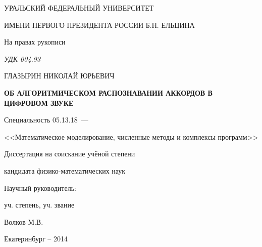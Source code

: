 \thispagestyle{empty}

\begin{center}
УРАЛЬСКИЙ ФЕДЕРАЛЬНЫЙ УНИВЕРСИТЕТ\par
ИМЕНИ ПЕРВОГО ПРЕЗИДЕНТА РОССИИ Б.Н. ЕЛЬЦИНА\par 
\par
\end{center}

\vspace{20mm}
\begin{flushright}
На правах рукописи

{\sl УДК 004.93}
\end{flushright}

\vspace{30mm}
\begin{center}
{\large ГЛАЗЫРИН НИКОЛАЙ ЮРЬЕВИЧ}
\end{center}

\vspace{5mm}
\begin{center}
{\bf \large ОБ АЛГОРИТМИЧЕСКОМ РАСПОЗНАВАНИИ АККОРДОВ В ЦИФРОВОМ ЗВУКЕ
\par}

\vspace{10mm}
{%
Специальность 05.13.18~---

<<Математическое моделирование, численные методы и комплексы программ>>
}

\vspace{10mm}
Диссертация на соискание учёной степени

кандидата физико-математических наук
\end{center}

\vspace{20mm}
\begin{flushright}
Научный руководитель:

уч. степень, уч. звание

Волков М.В.

\end{flushright}

\vspace{20mm}
\begin{center}
{Екатеринбург -- 2014}
\end{center}

\newpage